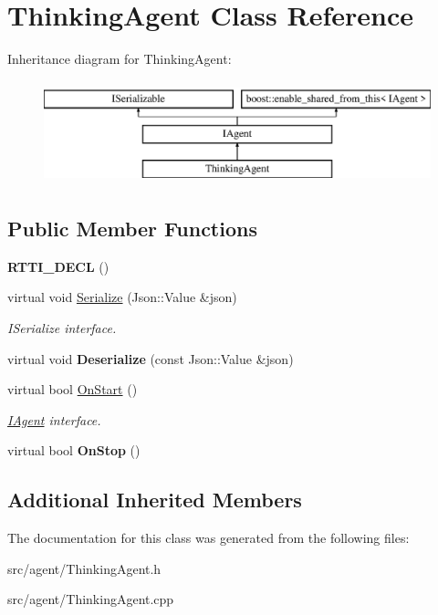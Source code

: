 \hypertarget{class_thinking_agent}{}\section{Thinking\+Agent Class Reference}
\label{class_thinking_agent}
Inheritance diagram for Thinking\+Agent\+:\begin{figure}[H]
\begin{center}
\leavevmode
\includegraphics[height=3.000000cm]{class_thinking_agent}
\end{center}
\end{figure}
\subsection*{Public Member Functions}
\begin{DoxyCompactItemize}
\item 
\mbox{\label{class_thinking_agent_aad9df039161a2f28188c444980490237}} 
{\bfseries R\+T\+T\+I\+\_\+\+D\+E\+CL} ()
\item 
\mbox{\label{class_thinking_agent_aa80b5d355a284e46eddc1c6d748014dc}} 
virtual void \hyperlink{class_thinking_agent_aa80b5d355a284e46eddc1c6d748014dc}{Serialize} (Json\+::\+Value \&json)
\begin{DoxyCompactList}\small\item\em I\+Serialize interface. \end{DoxyCompactList}\item 
\mbox{\label{class_thinking_agent_ae4fceb4fba1bfa06ffb5e93b41bf965e}} 
virtual void {\bfseries Deserialize} (const Json\+::\+Value \&json)
\item 
\mbox{\label{class_thinking_agent_ad8e82fb689f38dc5c9b807b605f5a5aa}} 
virtual bool \hyperlink{class_thinking_agent_ad8e82fb689f38dc5c9b807b605f5a5aa}{On\+Start} ()
\begin{DoxyCompactList}\small\item\em \hyperlink{class_i_agent}{I\+Agent} interface. \end{DoxyCompactList}\item 
\mbox{\label{class_thinking_agent_a7946fde332bf6ddc1c086d2cd1c5b733}} 
virtual bool {\bfseries On\+Stop} ()
\end{DoxyCompactItemize}
\subsection*{Additional Inherited Members}


The documentation for this class was generated from the following files\+:\begin{DoxyCompactItemize}
\item 
src/agent/Thinking\+Agent.\+h\item 
src/agent/Thinking\+Agent.\+cpp\end{DoxyCompactItemize}
